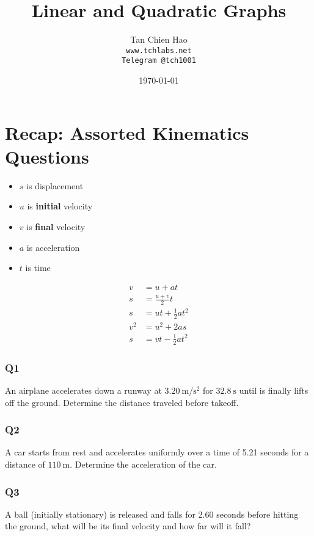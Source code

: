 \documentclass{article}
\title{Linear and Quadratic Graphs}
\author{
    Tan Chien Hao\\
    \texttt{www.tchlabs.net}\\
    \texttt{Telegram @tch1001}
}
\date{\today}
\begin{document}
\newif\ifpaper

\paperfalse 

\maketitle
\section{Recap: Assorted Kinematics Questions}
\begin{itemize}
    \item $s$ is displacement 
    \item $u$ is \textbf{initial} velocity 
    \item $v$ is \textbf{final} velocity
    \item $a$ is acceleration
    \item $t$ is time
\end{itemize}
\begin{align}
    v &= u + at \label{eq:vuat2} \\
    s &= \frac{u+v}{2} t \label{eq:suvt2}\\
s & =u t+\frac{1}{2} a t^2 \label{eq:suat2} \\
v^2 & =u^2+2 a s \label{eq:vuas2} \\
s & =v t-\frac{1}{2} a t^2 \label{eq:svat2}
\end{align}
\subsubsection{Q1}
An airplane accelerates down a runway at $3.20 \mathrm{~m} / \mathrm{s}^2$ for $32.8 \mathrm{~s}$ until is finally lifts off the ground. Determine the distance traveled before takeoff. \ifpaper Ans: $1720$ m \fi 
\subsubsection{Q2}
A car starts from rest and accelerates uniformly over a time of 5.21 seconds for a distance of $110 \mathrm{~m}$. Determine the acceleration of the car. \ifpaper Ans: $8.10 \text{m/s}^2$ \fi
\subsubsection{Q3}
A ball (initially stationary) is released and falls for 2.60 seconds before hitting the ground, what will be its final velocity and how far will it fall?
\ifpaper Ans:  $v=25.5$ m/s and $s=33.1$ m\fi
\end{document}
